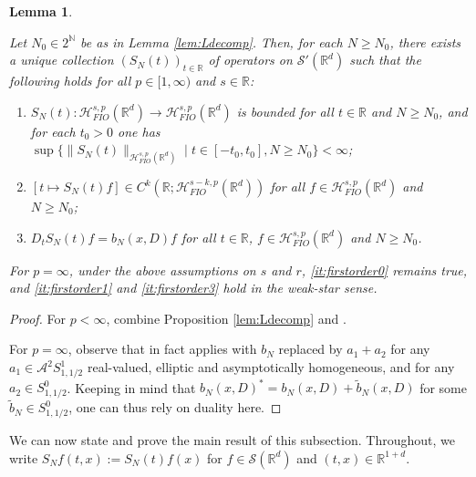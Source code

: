 \documentclass{amsart}
\numberwithin{equation}{section}
\newtheorem{lemma}[theorem]{Lemma}
\theoremstyle{definition}
\newcommand{\R}{\mathbb{R}}
\newcommand{\Rd}{\mathbb{R}^{d}}
\newcommand{\N}{\mathbb{N}}
\newcommand {\A}{\mathcal{A}}
\newcommand {\HT}{\mathcal{H}}
\newcommand {\Hps}{\mathcal{H}^{s,p}_{FIO}(\R^d)}
\newcommand {\ex}{\mathbf{e}}
\newcommand {\Sw}{\mathcal{S}}
\begin{document}
\begin{lemma}\label{lem:fixedtimesmooth}

Let $N_{0}\in 2^{\N}$ be as in Lemma \ref{lem:Ldecomp}. Then, for each $N\geq N_{0}$, there exists a unique collection $(S_{N}(t))_{t\in\R}$ of operators on $\Sw'(\Rd)$ such that the following holds for all $p\in[1,\infty)$ and $s\in\R$:
\begin{enumerate}
\item\label{it:firstorder0} $S_{N}(t):\Hps\to\Hps$ is bounded for all $t\in\R$ and $N\geq N_{0}$, and for each $t_{0}>0$ one has $\sup\{\|S_{N}(t)\|_{\Hps}\mid t\in[-t_{0},t_{0}], N\geq N_{0}\}<\infty$;
\item\label{it:firstorder1} $[t\mapsto S_{N}(t)f]\in C^{k}(\R;\HT^{s-k,p}_{FIO}(\R^d))$ for all $f\in\Hps$ and $N\geq N_{0}$; %
\item\label{it:firstorder3} $D_{t}S_{N}(t)f=b_{N}(x,D)f%
$ for all $t\in\R$, $f\in\Hps$ and $N\geq N_{0}$.
\end{enumerate}
For $p=\infty$, under the above assumptions on $s$ and $r$, \eqref{it:firstorder0} remains true, and \eqref{it:firstorder1} and \eqref{it:firstorder3} hold in the weak-star sense.
\end{lemma}
\begin{proof}
For $p<\infty$, combine Proposition \ref{lem:Ldecomp} and \cite[Theorem 4.3]{LiRoSo25a}. 

For $p=\infty$, observe that \cite[Theorem 4.3]{LiRoSo25a} in fact applies with $b_{N}$ replaced by $a_{1}+a_{2}$ for any $a_{1}\in \A^{2}S^{1}_{1,1/2}$ real-valued, elliptic and asymptotically homogeneous, and for any $a_{2}\in S^{0}_{1,1/2}$. Keeping in mind that $b_{N}(x,D)^{*}=b_{N}(x,D)+\tilde{b}_{N}(x,D)$ for some $\tilde{b}_{N}\in S^{0}_{1,1/2}$,  one can thus rely on duality here.  
\end{proof}

We can now state and prove the main result of this subsection. Throughout, we write $S_{N}f(t,x):=S_{N}(t)f(x)$ for $f\in\Sw(\Rd)$ and $(t,x)\in\R^{1+d}$. 
\end{document}
